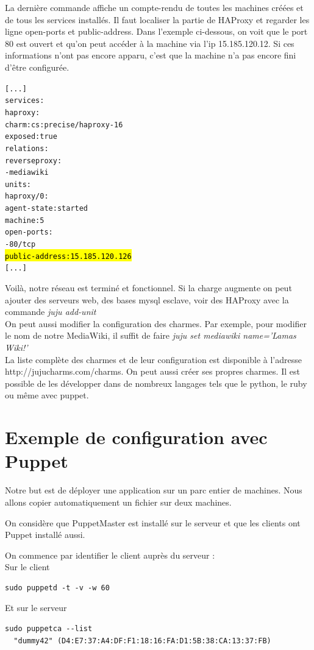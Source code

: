 \documentclass[a4paper,oneside]{report}
\begin{document}
La dernière commande affiche un compte-rendu de toutes les machines créées et de tous les services installés. Il faut localiser la partie de HAProxy et regarder les ligne open-ports et public-address. Dans l'exemple ci-dessous, on voit que le port 80 est ouvert et qu'on peut accéder à la machine via l'ip 15.185.120.12. Si ces informations n'ont pas encore apparu, c'est que la machine n'a pas encore fini d'être configurée. 
\begin{alltt}
[...]
services:
  haproxy:
    charm: cs:precise/haproxy-16
    exposed: true
    relations:
      reverseproxy:
      - mediawiki
    units:
      haproxy/0:
        agent-state: started
        machine: 5
        open-ports:
        - 80/tcp
        \hl{public-address: 15.185.120.126}
[...]
\end{alltt}

Voilà, notre réseau est terminé et fonctionnel. Si la charge augmente on peut ajouter des serveurs web, des bases mysql esclave, voir des HAProxy avec la commande \emph{juju add-unit}\\
On peut aussi modifier la configuration des charmes. Par exemple, pour modifier le nom de notre MediaWiki, il suffit de faire \emph{juju set mediawiki name='Lamas Wiki!'}\\
La liste complète des charmes et de leur configuration est disponible à l'adresse http://jujucharms.com/charms.
On peut aussi créer ses propres charmes. Il est possible de les développer dans de nombreux langages tels que le \gls{python}, le \gls{ruby} ou même avec puppet.
\newpage
\section{Exemple de configuration avec Puppet} \label{auto:puppet}
Notre but est de déployer une application sur un parc entier de machines.
Nous allons copier automatiquement un fichier sur deux machines.

On considère que PuppetMaster est installé sur le serveur et que les clients ont Puppet installé aussi.


On commence par identifier le client auprès du serveur :\\
Sur le client
\begin{verbatim}
sudo puppetd -t -v -w 60
\end{verbatim}

Et sur le serveur
\begin{verbatim}
sudo puppetca --list
  "dummy42" (D4:E7:37:A4:DF:F1:18:16:FA:D1:5B:38:CA:13:37:FB)
\end{verbatim}
\end{document}
